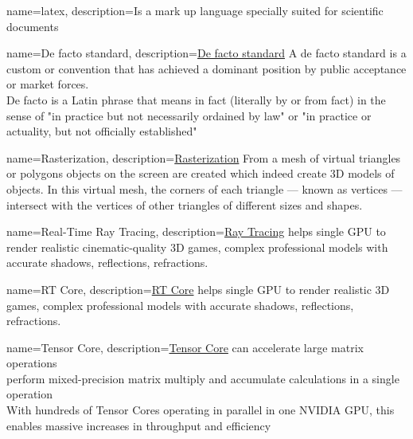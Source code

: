 {
	name=latex,
	description={Is a mark up language specially suited 
		for scientific documents}
}

{
	name=De facto standard,
	description={\href{https://en.wikipedia.org/wiki/De_facto_standard}{De facto standard} A de facto standard is a custom or convention that has achieved a dominant position by public acceptance or market forces.
    \\  De facto is a Latin phrase that means in fact (literally by or from fact) in the sense of "in practice but not necessarily ordained by law" or "in practice or actuality, but not officially established"
	}
}

{
	name=Rasterization,
	description={\href{https://www.computerhope.com/jargon/r/rasterize.htm}{Rasterization} From a mesh of virtual triangles or polygons objects on the screen are created which indeed create 3D models of objects. In this virtual mesh, the corners of each triangle — known as vertices — intersect with the vertices of other triangles of different sizes and shapes.
	}
}

{
    name=Real-Time Ray Tracing,
    description={\href{https://developer.nvidia.com/rtx/raytracing}{Ray Tracing} helps single GPU to render realistic cinematic-quality 3D games, complex professional models with accurate shadows, reflections, refractions.
    }
}

{
    name=RT Core,
    description={\href{https://developer.nvidia.com/taxonomy/term/1034}{RT Core} helps single GPU to render realistic 3D games, complex professional models with accurate shadows, reflections, refractions.
    }
}

{
    name=Tensor Core,
    description={\href{https://www.nvidia.com/en-us/data-center/tensorcore/}{Tensor Core} can accelerate large matrix operations
    \\ perform mixed-precision matrix multiply and accumulate calculations in a single operation
    \\ With hundreds of Tensor Cores operating in parallel in one NVIDIA GPU, this enables massive increases in throughput and efficiency
    }
}